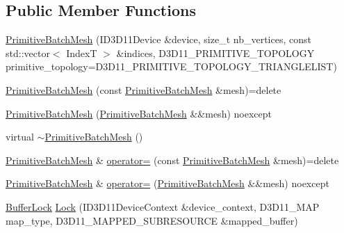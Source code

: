 \subsection*{Public Member Functions}
\begin{DoxyCompactItemize}
\item 
\hyperlink{classmage_1_1rendering_1_1_primitive_batch_mesh_aa01b243a0ccb0ed4835c4dcab994d030}{Primitive\+Batch\+Mesh} (I\+D3\+D11\+Device \&device, size\+\_\+t nb\+\_\+vertices, const std\+::vector$<$ IndexT $>$ \&indices, D3\+D11\+\_\+\+P\+R\+I\+M\+I\+T\+I\+V\+E\+\_\+\+T\+O\+P\+O\+L\+O\+GY primitive\+\_\+topology=D3\+D11\+\_\+\+P\+R\+I\+M\+I\+T\+I\+V\+E\+\_\+\+T\+O\+P\+O\+L\+O\+G\+Y\+\_\+\+T\+R\+I\+A\+N\+G\+L\+E\+L\+I\+ST)
\item 
\hyperlink{classmage_1_1rendering_1_1_primitive_batch_mesh_a9f20b29914746fbb29b8c5146f7f63a2}{Primitive\+Batch\+Mesh} (const \hyperlink{classmage_1_1rendering_1_1_primitive_batch_mesh}{Primitive\+Batch\+Mesh} \&mesh)=delete
\item 
\hyperlink{classmage_1_1rendering_1_1_primitive_batch_mesh_ac46a8538b295cf4d85c7309d2bb4cdd5}{Primitive\+Batch\+Mesh} (\hyperlink{classmage_1_1rendering_1_1_primitive_batch_mesh}{Primitive\+Batch\+Mesh} \&\&mesh) noexcept
\item 
virtual \hyperlink{classmage_1_1rendering_1_1_primitive_batch_mesh_a96bb7d8ce20047163ec851b426087c80}{$\sim$\+Primitive\+Batch\+Mesh} ()
\item 
\hyperlink{classmage_1_1rendering_1_1_primitive_batch_mesh}{Primitive\+Batch\+Mesh} \& \hyperlink{classmage_1_1rendering_1_1_primitive_batch_mesh_a64b661150ec319d4dab092d44315bb67}{operator=} (const \hyperlink{classmage_1_1rendering_1_1_primitive_batch_mesh}{Primitive\+Batch\+Mesh} \&mesh)=delete
\item 
\hyperlink{classmage_1_1rendering_1_1_primitive_batch_mesh}{Primitive\+Batch\+Mesh} \& \hyperlink{classmage_1_1rendering_1_1_primitive_batch_mesh_a36409f6de1208f30069309675b19feb2}{operator=} (\hyperlink{classmage_1_1rendering_1_1_primitive_batch_mesh}{Primitive\+Batch\+Mesh} \&\&mesh) noexcept
\item 
\hyperlink{classmage_1_1rendering_1_1_buffer_lock}{Buffer\+Lock} \hyperlink{classmage_1_1rendering_1_1_primitive_batch_mesh_a9f7559afb797103d6c0f9d3c0cb3a0f3}{Lock} (I\+D3\+D11\+Device\+Context \&device\+\_\+context, D3\+D11\+\_\+\+M\+AP map\+\_\+type, D3\+D11\+\_\+\+M\+A\+P\+P\+E\+D\+\_\+\+S\+U\+B\+R\+E\+S\+O\+U\+R\+CE \&mapped\+\_\+buffer)
\end{DoxyCompactItemize}
